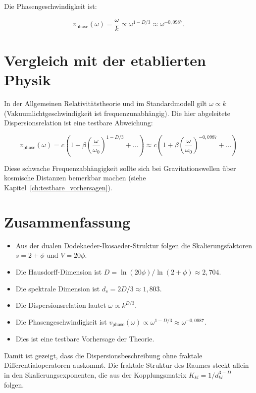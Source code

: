 Die Phasengeschwindigkeit ist:

\[
v_{\text{phase}}(\omega) = \frac{\omega}{k} \propto \omega^{1 - D/3} \approx \omega^{-0,0987}.
\]

\section{Vergleich mit der etablierten Physik}
\label{app:spektrale_vergleich}

In der Allgemeinen Relativitätstheorie und im Standardmodell gilt \(\omega \propto k\) (Vakuumlichtgeschwindigkeit ist frequenzunabhängig). Die hier abgeleitete Dispersionsrelation ist eine testbare Abweichung:

\[
v_{\text{phase}}(\omega) = c \left( 1 + \beta \left( \frac{\omega}{\omega_0} \right)^{1 - D/3} + \dots \right) \approx c \left( 1 + \beta \left( \frac{\omega}{\omega_0} \right)^{-0,0987} + \dots \right)
\]

Diese schwache Frequenzabhängigkeit sollte sich bei Gravitationswellen über kosmische Distanzen bemerkbar machen (siehe Kapitel~\ref{ch:testbare_vorhersagen}).

\section{Zusammenfassung}
\label{app:spektrale_zusammenfassung}

\begin{itemize}
    \item Aus der dualen Dodekaeder-Ikosaeder-Struktur folgen die Skalierungsfaktoren \(s = 2+\phi\) und \(V = 20\phi\).
    \item Die Hausdorff-Dimension ist \(D = \ln(20\phi)/\ln(2+\phi) \approx 2,704\).
    \item Die spektrale Dimension ist \(d_s = 2D/3 \approx 1,803\).
    \item Die Dispersionsrelation lautet \(\omega \propto k^{D/3}\).
    \item Die Phasengeschwindigkeit ist \(v_{\text{phase}}(\omega) \propto \omega^{1-D/3} \approx \omega^{-0,0987}\).
    \item Dies ist eine testbare Vorhersage der Theorie.
\end{itemize}

Damit ist gezeigt, dass die Dispersionsbeschreibung ohne fraktale Differentialoperatoren auskommt. Die fraktale Struktur des Raumes steckt allein in den Skalierungsexponenten, die aus der Kopplungsmatrix \(K_{kl} = 1/d_{kl}^{3-D}\) folgen.